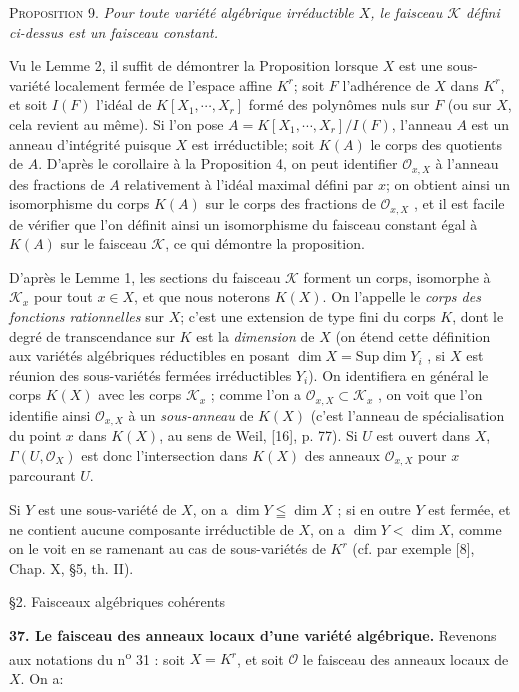 \textsc{Proposition} 9. \textit{Pour toute variété algébrique irréductible $X$, le faisceau $\mathcal{K}$ défini ci-dessus est un faisceau constant.}

Vu le Lemme 2, il suffit de démontrer la Proposition lorsque $X$ est une sous-variété localement fermée de l'espace affine $K^r$; soit $F$ l'adhérence de $X$ dans $K^r$, et soit $I(F)$ l'idéal de $K[X_1 , \cdots , X_r]$ formé des polynômes nuls sur $F$ (ou sur $X$, cela revient au même). Si l'on pose $A = K[X_1 , \cdots , X_r]/I(F)$, l'anneau $A$ est un anneau d'intégrité puisque $X$ est irréductible; soit $K(A)$ le corps des quotients de $A$. D'après le corollaire à la Proposition 4, on peut identifier $\mathcal{O}_{x,X}$
à l'anneau des fractions de $A$ relativement à l'idéal maximal défini par $x$; on obtient ainsi un isomorphisme du corps $K(A)$ sur le corps des fractions de $\mathcal{O}_{x,X}$ , et il est facile de vérifier que l'on définit ainsi un isomorphisme du faisceau constant égal à $K(A)$ sur le faisceau $\mathcal{K}$, ce qui démontre la proposition.

D'après le Lemme 1, les sections du faisceau $\mathcal{K}$ forment un corps, isomorphe à $\mathcal{K}_x$ pour tout $x \in X$, et que nous noterons $K(X)$. On l'appelle le \textit{corps des fonctions rationnelles} sur $X$; c'est une extension de type fini du corps $K$, dont le degré de transcendance sur $K$ est la \textit{dimension} de $X$ (on étend cette définition aux variétés algébriques réductibles en posant $\dim X = \mathrm{Sup} \dim Y_i$ , si $X$ est réunion des sous-variétés fermées irréductibles $Y_i$). On identifiera en général le corps $K(X)$ avec les corps $\mathcal{K}_x$ ; comme l'on a $\mathcal{O}_{x,X} \subset \mathcal{K}_x$ , on voit que l'on identifie ainsi $\mathcal{O}_{x,X}$ à un \textit{sous-anneau} de $K(X)$ (c'est l'anneau de spécialisation du point $x$ dans $K(X)$, au sens de Weil, [16], p. 77). Si $U$ est ouvert dans $X$, $\Gamma(U, \mathcal{O}_X)$ est donc l'intersection dans $K(X)$ des anneaux $\mathcal{O}_{x,X}$ pour $x$ parcourant $U$.

Si $Y$ est une sous-variété de $X$, on a $\dim Y \leqq \dim X$ ; si en outre $Y$ est fermée, et ne contient aucune composante irréductible de $X$, on a $\dim Y < \dim X$, comme on le voit en se ramenant au cas de sous-variétés de $K^r$ (cf. par exemple [8], Chap. X, \S5, th. II).


\S2. Faisceaux algébriques cohérents

\textbf{37. Le faisceau des anneaux locaux d'une variété algébrique.} Revenons aux notations du n\textsuperscript{o} 31 : soit $X = K^r$, et soit $\mathcal{O}$ le faisceau des anneaux locaux de $X$. On a:

